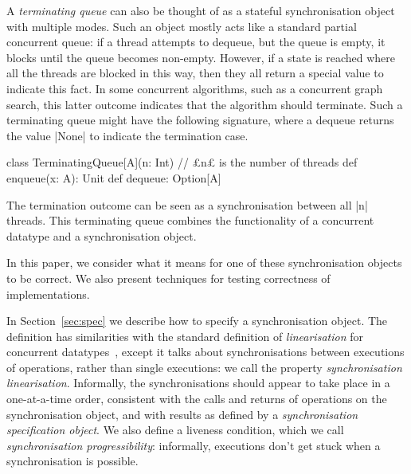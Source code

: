 A \emph{terminating queue} can also be thought of as a stateful
synchronisation object with multiple modes.  Such an object mostly acts like a
standard partial concurrent queue: if a thread attempts to dequeue, but the
queue is empty, it blocks until the queue becomes non-empty.  However, if a
state is reached where all the threads are blocked in this way, then they all
return a special value to indicate this fact.  In some concurrent algorithms,
such as a concurrent graph search, this latter outcome indicates that the
algorithm should terminate.  Such a terminating queue might have the following
signature, where a dequeue returns the value |None| to indicate the
termination case.
%
\begin{scala}
class TerminatingQueue[A](n: Int){ // £n£ is the number of threads   
  def enqueue(x: A): Unit
  def dequeue: Option[A]
}
\end{scala} 
%
The termination outcome can be seen as a synchronisation between all |n|
threads.  This terminating queue combines the functionality of a
concurrent datatype and a synchronisation object.



In this paper, we consider what it means for one of these synchronisation
objects to be correct.  We also present techniques for testing correctness of
implementations.

In Section~\ref{sec:spec} we describe how to specify a synchronisation object.
The definition has similarities with the standard definition of
\emph{linearisation} for concurrent
datatypes~\cite{herlihy-wing,herlihy-shavit}, except it talks about
synchronisations between executions of operations, rather than single
executions: we call the property \emph{synchronisation linearisation}.
Informally, the synchronisations should appear to take place in a
one-at-a-time order, consistent with the calls and returns of operations on
the synchronisation object, and with results as defined by a
\emph{synchronisation specification object}.  We also define a liveness
condition, which we call \emph{synchronisation progressibility}: informally,
executions don't get stuck when a synchronisation is possible.

